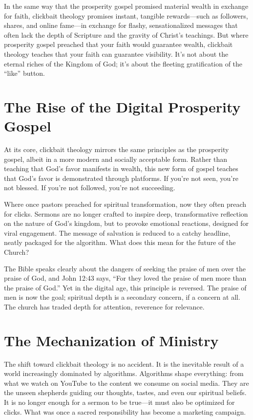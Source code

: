 \documentclass[a4paper,11pt]{book}
\begin{document}
In the same way that the prosperity gospel promised material wealth in exchange for faith, clickbait theology promises instant, tangible rewards—such as followers, shares, and online fame—in exchange for flashy, sensationalized messages that often lack the depth of Scripture and the gravity of Christ’s teachings. But where prosperity gospel preached that your faith would guarantee wealth, clickbait theology teaches that your faith can guarantee visibility. It's not about the eternal riches of the Kingdom of God; it's about the fleeting gratification of the “like” button.

\section{The Rise of the Digital Prosperity Gospel}

At its core, clickbait theology mirrors the same principles as the prosperity gospel, albeit in a more modern and socially acceptable form. Rather than teaching that God’s favor manifests in wealth, this new form of gospel teaches that God’s favor is demonstrated through platforms. If you’re not seen, you’re not blessed. If you’re not followed, you’re not succeeding.

Where once pastors preached for spiritual transformation, now they often preach for clicks. Sermons are no longer crafted to inspire deep, transformative reflection on the nature of God’s kingdom, but to provoke emotional reactions, designed for viral engagement. The message of salvation is reduced to a catchy headline, neatly packaged for the algorithm. What does this mean for the future of the Church?

The Bible speaks clearly about the dangers of seeking the praise of men over the praise of God, and John 12:43 says, “For they loved the praise of men more than the praise of God.” Yet in the digital age, this principle is reversed. The praise of men is now the goal; spiritual depth is a secondary concern, if a concern at all. The church has traded depth for attention, reverence for relevance.

\section{The Mechanization of Ministry}

The shift toward clickbait theology is no accident. It is the inevitable result of a world increasingly dominated by algorithms. Algorithms shape everything: from what we watch on YouTube to the content we consume on social media. They are the unseen shepherds guiding our thoughts, tastes, and even our spiritual beliefs. It is no longer enough for a sermon to be true—it must also be optimized for clicks. What was once a sacred responsibility has become a marketing campaign.
\end{document}
